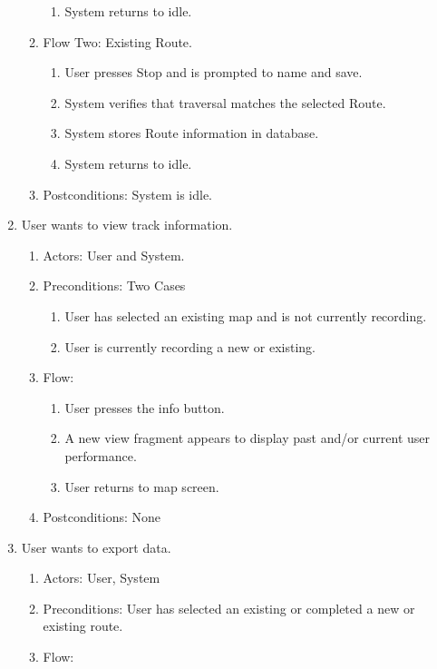 \documentclass{article}
\begin{document}
\begin{enumerate}
\begin{enumerate}
\begin{enumerate}
            \item System returns to idle.
            \end{enumerate}
        \item Flow Two: Existing Route.
            \begin{enumerate}
            \item User presses Stop and is prompted to name and save.
            \item System verifies that traversal matches the selected Route.
            \item System stores Route information in database.
            \item System returns to idle.
            \end{enumerate}
        \item Postconditions: System is idle.
    \end{enumerate}
\item User wants to view track information.
    \begin{enumerate}
        \item Actors: User and System.
        \item Preconditions: Two Cases
            \begin{enumerate}
            \item User has selected an existing map and is not currently recording.
            \item User is currently recording a new or existing.
            \end{enumerate}
        \item Flow:
            \begin{enumerate}
            \item User presses the info button.
            \item A new view fragment appears to display past and/or current user performance.
            \item User returns to map screen.
            \end{enumerate}
        \item Postconditions: None
    \end{enumerate}
\item User wants to export data.
    \begin{enumerate}
        \item Actors: User, System
        \item Preconditions: User has selected an existing or completed a new or existing route.
        \item Flow:

\end{enumerate}
\end{enumerate}
\end{document}
